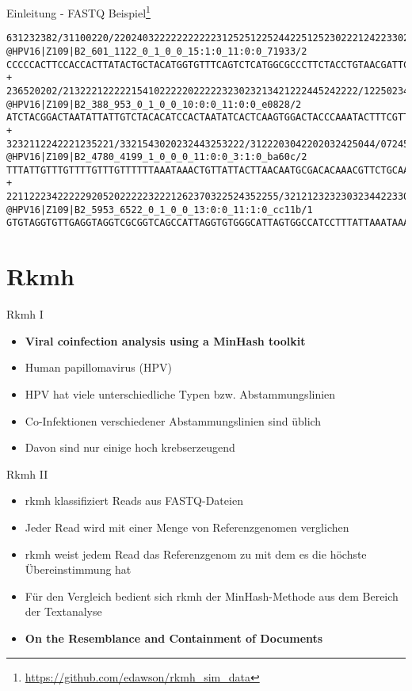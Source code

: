 \begin{frame}[fragile]{Einleitung - FASTQ Beispiel\footnote{\url{https://github.com/edawson/rkmh_sim_data}}}
    \begin{verbatim}
631232382/31100220/2202403222222222223125251225244225125230222124223302
@HPV16|Z109|B2_601_1122_0_1_0_0_15:1:0_11:0:0_71933/2
CCCCCACTTCCACCACTTATACTGCTACATGGTGTTTCAGTCTCATGGCGCCCTTCTACCTGTAACGATTC
+
236520202/2132221222221541022222022222323023213421222445242222/12250234
@HPV16|Z109|B2_388_953_0_1_0_0_10:0:0_11:0:0_e0828/2
ATCTACGGACTAATATTATTGTCTACACATCCACTAATATCACTCAAGTGGACTACCCAAATACTTTCGTT
+
3232112242221235221/3321543020232443253222/3122203042202032425044/07245
@HPV16|Z109|B2_4780_4199_1_0_0_0_11:0:0_3:1:0_ba60c/2
TTTATTGTTTGTTTTGTTTGTTTTTTAAATAAACTGTTATTACTTAACAATGCGACACAAACGTTCTGCAA
+
221122234222229205202222232221262370322524352255/3212123232303234422330
@HPV16|Z109|B2_5953_6522_0_1_0_0_13:0:0_11:1:0_cc11b/1
GTGTAGGTGTTGAGGTAGGTCGCGGTCAGCCATTAGGTGTGGGCATTAGTGGCCATCCTTTATTAAATAAA
    \end{verbatim}
\end{frame}

\section{Rkmh}

\begin{frame}{Rkmh I}
    \begin{itemize}
        \item \textbf{Viral coinfection analysis using a MinHash toolkit \cite{rkmh}} \pause
        \item Human papillomavirus (HPV) \pause
        \item HPV hat viele unterschiedliche Typen bzw. Abstammungslinien \pause
        \item Co-Infektionen verschiedener Abstammungslinien sind üblich \pause
        \item Davon sind nur einige hoch krebserzeugend
    \end{itemize}
\end{frame}

\begin{frame}{Rkmh II}
    \begin{itemize}
        \item rkmh klassifiziert Reads aus FASTQ-Dateien \pause
        \item Jeder Read wird mit einer Menge von Referenzgenomen verglichen \pause
        \item rkmh weist jedem Read das Referenzgenom zu mit dem es die höchste Übereinstimmung hat \pause
        \item Für den Vergleich bedient sich rkmh der MinHash-Methode  aus dem Bereich der Textanalyse \pause
        \item \textbf{On the Resemblance and Containment of Documents \cite{minhash}}
    \end{itemize}
\end{frame}